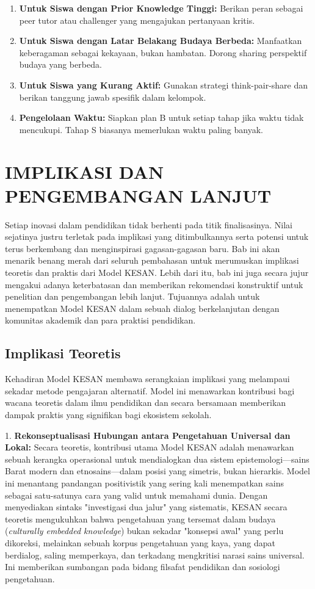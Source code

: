 \documentclass[12pt,a4paper,oneside]{book}
\begin{document}
\begin{enumerate}
\item \textbf{Untuk Siswa dengan Prior Knowledge Tinggi:} Berikan peran sebagai peer tutor atau challenger yang mengajukan pertanyaan kritis.
\item \textbf{Untuk Siswa dengan Latar Belakang Budaya Berbeda:} Manfaatkan keberagaman sebagai kekayaan, bukan hambatan. Dorong sharing perspektif budaya yang berbeda.
\item \textbf{Untuk Siswa yang Kurang Aktif:} Gunakan strategi think-pair-share dan berikan tanggung jawab spesifik dalam kelompok.
\item \textbf{Pengelolaan Waktu:} Siapkan plan B untuk setiap tahap jika waktu tidak mencukupi. Tahap S biasanya memerlukan waktu paling banyak.
\end{enumerate}

\chapter{IMPLIKASI DAN PENGEMBANGAN LANJUT}

Setiap inovasi dalam pendidikan tidak berhenti pada titik finalisasinya. Nilai sejatinya justru terletak pada implikasi yang ditimbulkannya serta potensi untuk terus berkembang dan menginspirasi gagasan-gagasan baru. Bab ini akan menarik benang merah dari seluruh pembahasan untuk merumuskan implikasi teoretis dan praktis dari Model KESAN. Lebih dari itu, bab ini juga secara jujur mengakui adanya keterbatasan dan memberikan rekomendasi konstruktif untuk penelitian dan pengembangan lebih lanjut. Tujuannya adalah untuk menempatkan Model KESAN dalam sebuah dialog berkelanjutan dengan komunitas akademik dan para praktisi pendidikan.

\section{Implikasi Teoretis}

Kehadiran Model KESAN membawa serangkaian implikasi yang melampaui sekadar metode pengajaran alternatif. Model ini menawarkan kontribusi bagi wacana teoretis dalam ilmu pendidikan dan secara bersamaan memberikan dampak praktis yang signifikan bagi ekosistem sekolah.

1.  \textbf{Rekonseptualisasi Hubungan antara Pengetahuan Universal dan Lokal:}
    Secara teoretis, kontribusi utama Model KESAN adalah menawarkan sebuah kerangka operasional untuk mendialogkan dua sistem epistemologi—sains Barat modern dan etnosains—dalam posisi yang simetris, bukan hierarkis. Model ini menantang pandangan positivistik yang sering kali menempatkan sains sebagai satu-satunya cara yang valid untuk memahami dunia. Dengan menyediakan sintaks "investigasi dua jalur" yang sistematis, KESAN secara teoretis mengukuhkan bahwa pengetahuan yang tersemat dalam budaya (\textit{culturally embedded knowledge}) bukan sekadar "konsepsi awal" yang perlu dikoreksi, melainkan sebuah korpus pengetahuan yang kaya, yang dapat berdialog, saling memperkaya, dan terkadang mengkritisi narasi sains universal. Ini memberikan sumbangan pada bidang filsafat pendidikan dan sosiologi pengetahuan.
\end{document}
